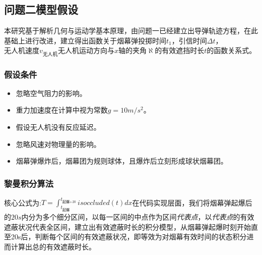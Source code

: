 \documentclass{article}
\begin{document}
\subsection{问题二模型假设}
本研究基于解析几何与运动学基本原理，由问题一已经建立出导弹轨迹方程，在此基础上进行改进，建立得出函数关于烟幕弹投掷时间$t_1$，引信时间$\Delta t$，$无人机速度 v_\text{无人机}$$无人机运动方向与x轴的夹角\aleph$的有效遮挡时长$t$的函数关系式。


\subsubsection{假设条件}
\begin{itemize}
    \item 忽略空气阻力的影响。
    \item 重力加速度在计算中视为常数$g = 10m/s^2$。
    \item 假设无人机没有反应延迟。
    \item 忽略风速对物理量的影响。
    \item 烟幕弹爆炸后，烟幕团为规则球体，且爆炸后立刻形成球状烟幕团。
\end{itemize}
\subsubsection{黎曼积分算法}
核心公式为:$T = \int_{t_\text{起爆}}^{t_\text{起爆+20}}isoccluded(t)dx$在代码实现层面，我们将烟幕弹起爆后的$20s$内分为多个细分区间，以每一区间的中点作为区间\textit{代表点}，以\textit{代表点}的有效遮蔽状况代表全区间，建立出有效遮蔽时长的积分模型，从烟幕弹起爆时刻开始直至20s后，判断每个区间的有效遮蔽状况，即等效为对烟幕有效时间的状态积分进而计算出总的有效遮蔽时长。
\end{document}
